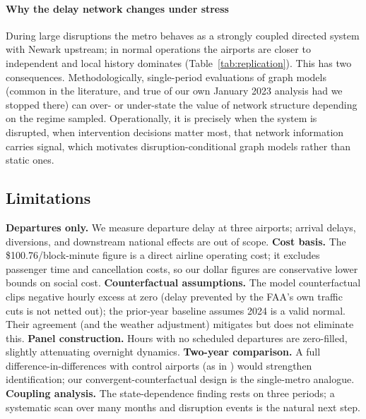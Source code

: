\documentclass[10pt,journal]{IEEEtran}
\begin{document}
\paragraph{Why the delay network changes under stress}
During large disruptions the metro behaves as a strongly coupled directed
system with Newark upstream; in normal operations the airports are closer to
independent and local history dominates (Table~\ref{tab:replication}). This has
two consequences. Methodologically, single-period evaluations of graph
models (common in the literature, and true of our own January 2023 analysis
had we stopped there) can over- or under-state the value of network structure
depending on the regime sampled. Operationally, it is precisely when the system
is disrupted, when intervention decisions matter most, that network information
carries signal, which motivates disruption-conditional graph models rather than
static ones.

\subsection{Limitations}
\label{sec:limitations}
\textbf{Departures only.} We measure departure delay at three airports;
arrival delays, diversions, and downstream national effects are out of scope.
\textbf{Cost basis.} The \$100.76/block-minute figure is a direct airline
operating cost; it excludes passenger time and cancellation costs, so our
dollar figures are conservative lower bounds on social cost.
\textbf{Counterfactual assumptions.} The model counterfactual clips negative
hourly excess at zero (delay prevented by the FAA's own traffic cuts is not
netted out); the prior-year baseline assumes 2024 is a valid normal. Their
agreement (and the weather adjustment) mitigates but does not eliminate this.
\textbf{Panel construction.} Hours with no scheduled departures are zero-filled,
slightly attenuating overnight dynamics.
\textbf{Two-year comparison.} A full difference-in-differences with control
airports (as in \cite{richmondfed2025}) would strengthen identification; our
convergent-counterfactual design is the single-metro analogue.
\textbf{Coupling analysis.} The state-dependence finding rests on three
periods; a systematic scan over many months and disruption events is the
natural next step.

\end{document}
